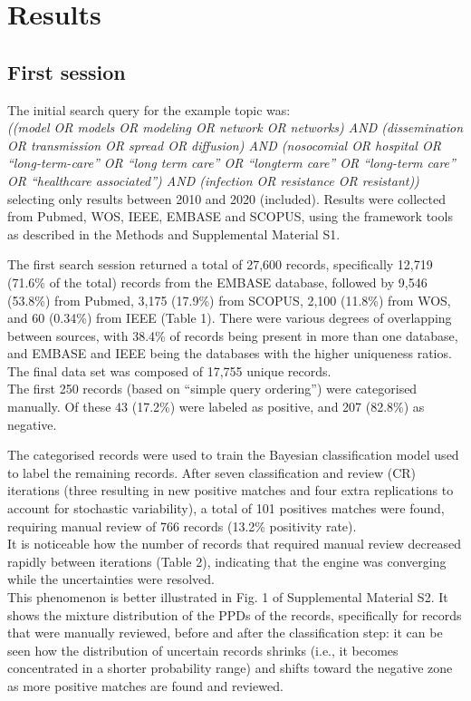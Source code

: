 \documentclass[]{bmcart}
\begin{document}
\section*{Results}

\subsection*{First session}

The initial search query for the example topic was:\\

\emph{((model OR models OR modeling OR network OR networks) AND
(dissemination OR transmission OR spread OR diffusion) AND (nosocomial
OR hospital OR ``long-term-care'' OR ``long term care'' OR ``longterm
care'' OR ``long-term care'' OR ``healthcare associated'') AND
(infection OR resistance OR resistant))}\\

selecting only results between 2010 and 2020 (included). Results were
collected from Pubmed, WOS, IEEE, EMBASE and SCOPUS, using the framework
tools as described in the Methods and Supplemental Material S1.

The first search session returned a total of 27,600 records,
specifically 12,719 (71.6\% of the total) records from the EMBASE
database, followed by 9,546 (53.8\%) from Pubmed, 3,175 (17.9\%) from
SCOPUS, 2,100 (11.8\%) from WOS, and 60 (0.34\%) from IEEE (Table 1).
There were various degrees of overlapping between sources, with 38.4\%
of records being present in more than one database, and EMBASE and IEEE
being the databases with the higher uniqueness ratios. The final data
set was composed of 17,755 unique records.\\
The first 250 records (based on ``simple query ordering'') were
categorised manually. Of these 43 (17.2\%) were labeled as positive, and
207 (82.8\%) as negative.

The categorised records were used to train the Bayesian classification
model used to label the remaining records. After seven classification
and review (CR) iterations (three resulting in new positive matches and
four extra replications to account for stochastic variability), a total
of 101 positives matches were found, requiring manual review of 766
records (13.2\% positivity rate).\\
It is noticeable how the number of records that required manual review
decreased rapidly between iterations (Table 2), indicating that the
engine was converging while the uncertainties were resolved.\\
This phenomenon is better illustrated in Fig. 1 of Supplemental Material
S2. It shows the mixture distribution of the PPDs of the records,
specifically for records that were manually reviewed, before and after
the classification step: it can be seen how the distribution of
uncertain records shrinks (i.e., it becomes concentrated in a shorter
probability range) and shifts toward the negative zone as more positive
matches are found and reviewed.
\end{document}
